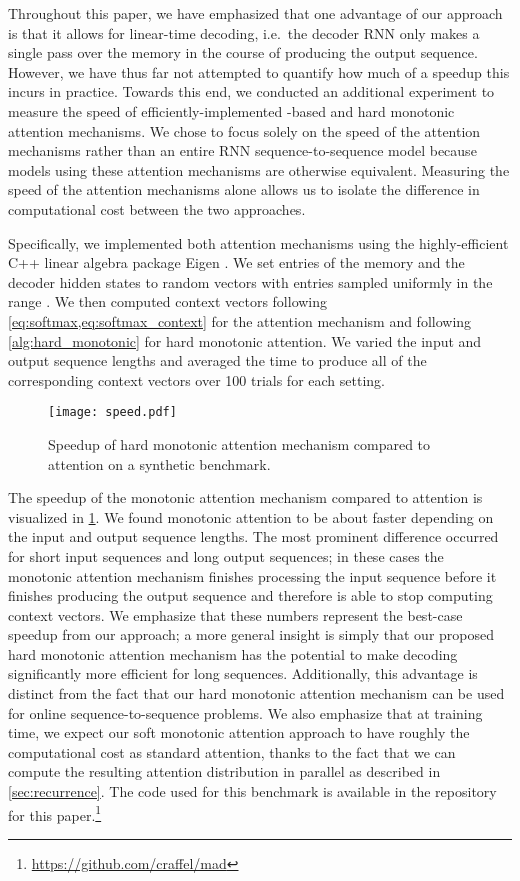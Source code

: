 \documentclass{article}
\begin{document}
Throughout this paper, we have emphasized that one advantage of our approach is that it allows for linear-time decoding, i.e.\ the decoder RNN only makes a single pass over the memory in the course of producing the output sequence.
However, we have thus far not attempted to quantify how much of a speedup this incurs in practice.
Towards this end, we conducted an additional experiment to measure the speed of efficiently-implemented -based and hard monotonic attention mechanisms.
We chose to focus solely on the speed of the attention mechanisms rather than an entire RNN sequence-to-sequence model because models using these attention mechanisms are otherwise equivalent.
Measuring the speed of the attention mechanisms alone allows us to isolate the difference in computational cost between the two approaches.

Specifically, we implemented both attention mechanisms using the highly-efficient C++ linear algebra package Eigen .
We set entries of the memory  and the decoder hidden states  to random vectors with entries sampled uniformly in the range .
We then computed context vectors following \cref{eq:softmax,eq:softmax_context} for the  attention mechanism and following \cref{alg:hard_monotonic} for hard monotonic attention.
We varied the input and output sequence lengths and averaged the time to produce all of the corresponding context vectors over 100 trials for each setting.

\begin{figure}[t]
\vskip 0.2in
\begin{center}
\centerline{\texttt{[image: speed.pdf]}}
\caption{Speedup of hard monotonic attention mechanism compared to  attention on a synthetic benchmark.}
\label{fig:speed}
\end{center}
\vskip -0.2in
\end{figure}

The speedup of the monotonic attention mechanism compared to  attention is visualized in \cref{fig:speed}.
We found monotonic attention to be about  faster depending on the input and output sequence lengths.
The most prominent difference occurred for short input sequences and long output sequences; in these cases the monotonic attention mechanism finishes processing the input sequence before it finishes producing the output sequence and therefore is able to stop computing context vectors.
We emphasize that these numbers represent the best-case speedup from our approach; a more general insight is simply that our proposed hard monotonic attention mechanism has the potential to make decoding significantly more efficient for long sequences.
Additionally, this advantage is distinct from the fact that our hard monotonic attention mechanism can be used for online sequence-to-sequence problems.
We also emphasize that at training time, we expect our soft monotonic attention approach to have roughly the computational cost as standard  attention, thanks to the fact that we can compute the resulting attention distribution in parallel as described in \cref{sec:recurrence}.
The code used for this benchmark is available in the repository for this paper.\footnote{\url{https://github.com/craffel/mad}}
\end{document}
